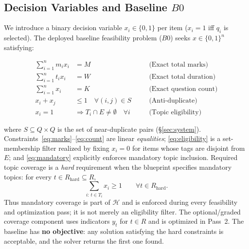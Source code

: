 \documentclass[runningheads]{llncs}
\begin{document}
\subsection{Decision Variables and Baseline $B0$}
We introduce a binary decision variable $x_i\in\{0,1\}$ per item ($x_i=1$ iff $q_i$ is selected).
The deployed baseline feasibility problem ($B0$) seeks $x\in\{0,1\}^n$ satisfying:

\begin{align}
\sum_{i=1}^n m_i x_i &= M \quad &&\text{(Exact total marks)} \label{eq:marks} \\
\sum_{i=1}^n t_i x_i &= W \quad &&\text{(Exact total duration)} \label{eq:time} \\
\sum_{i=1}^n x_i &= K \quad &&\text{(Exact question count)} \label{eq:count} \\
x_i + x_j &\le 1 \quad \forall (i,j)\in S \quad &&\text{(Anti-duplicate)} \label{eq:conflict} \\
x_i = 1 &\Rightarrow T_i\cap E\neq\emptyset \quad \forall i \quad &&\text{(Topic eligibility)} \label{eq:eligibility}
\end{align}

\noindent where $S\subseteq Q\times Q$ is the set of near-duplicate pairs (\S\ref{sec:system}).
Constraints~\eqref{eq:marks}--\eqref{eq:count} are linear \emph{equalities}; \eqref{eq:eligibility} is a set-membership filter realized by fixing $x_i=0$ for items whose tags are disjoint from $E$; and \eqref{eq:mandatory} explicitly enforces mandatory topic inclusion.
Required topic coverage is a \emph{hard} requirement when the blueprint specifies mandatory topics: for every $t\in R_{\mathrm{hard}}\subseteq R$,
\begin{equation}
\sum_{i:\,t\in T_i}x_i \ge 1 \qquad \forall t\in R_{\mathrm{hard}}.
\label{eq:mandatory}
\end{equation}
Thus mandatory coverage is part of $\mathcal{H}$ and is enforced during every feasibility and optimization pass; it is not merely an eligibility filter. The optional/graded coverage component uses indicators $y_t$ for $t\in R$ and is optimized in Pass~2. The baseline has \textbf{no objective}: any solution satisfying the hard constraints is acceptable, and the solver returns the first one found.
\end{document}
